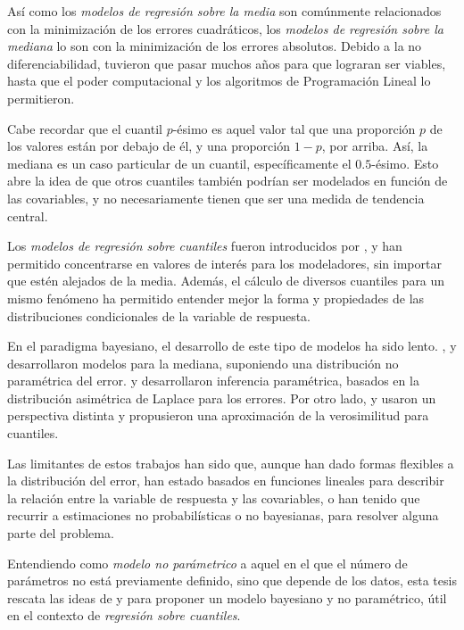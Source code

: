 As\'i como los \textit{modelos de regresi\'on sobre la media} son com\'unmente relacionados con la minimizaci\'on de los errores cuadr\'aticos, los \textit{modelos de regresi\'on sobre la mediana} lo son con la minimizaci\'on de los errores absolutos. Debido a la no diferenciabilidad, tuvieron que pasar muchos años para que lograran ser viables, hasta que el poder computacional y los algoritmos de Programaci\'on Lineal lo permitieron.

Cabe recordar que el cuantil $p$-\'esimo es aquel valor tal que una proporci\'on $p$ de los valores est\'an por debajo de \'el, y una proporci\'on $1-p$, por arriba. As\'i, la mediana es un caso particular de un cuantil, espec\'ificamente el $0.5$-\'esimo. Esto abre la idea de que otros cuantiles tambi\'en podr\'ian ser modelados en funci\'on de las covariables, y no necesariamente tienen que ser una medida de tendencia central. 

Los \textit{modelos de regresi\'on sobre cuantiles} fueron introducidos por \cite{Koenker_QuantReg}, y han permitido concentrarse en valores de inter\'es para los modeladores, sin importar que est\'en alejados de la media. Adem\'as, el c\'alculo de diversos cuantiles para un mismo fen\'omeno ha permitido entender mejor la forma y propiedades de las distribuciones condicionales de la variable de respuesta.

En el paradigma bayesiano, el desarrollo de este tipo de modelos ha sido lento. \cite{Walker_BayesAccFail}, \cite{Kottas_BaySemiparamMed} y \cite{Hanson_PolyaTrees} desarrollaron modelos para la mediana, suponiendo una distribuci\'on no param\'etrica del error. \cite{Yu_BayQuantReg} y \cite{Tsionas_BayQuantInf} desarrollaron inferencia param\'etrica, basados en la distribuci\'on asim\'etrica de Laplace para los errores. Por otro lado, \cite{Lavine_LikeQuant} y \cite{Dunson_ApproxBayes} usaron un perspectiva distinta y propusieron una aproximaci\'on de la verosimilitud para cuantiles.

Las limitantes de estos trabajos han sido que, aunque han dado formas flexibles a la distribuci\'on del error, han estado basados en funciones lineales para describir la relaci\'on entre la variable de respuesta y las covariables, o han tenido que recurrir a estimaciones no probabil\'isticas o no bayesianas, para resolver alguna parte del problema.

Entendiendo como \textit{modelo no par\'ametrico} a aquel en el que el n\'umero de par\'ametros no est\'a previamente definido, sino que depende de los datos, esta tesis rescata las ideas de \cite{Kottas_NotParamQuantReg} y \cite{Kottas_SemiparamQuantReg} para proponer un modelo bayesiano y no param\'etrico, \'util en el contexto de \textit{regresi\'on sobre cuantiles}.

\newpage